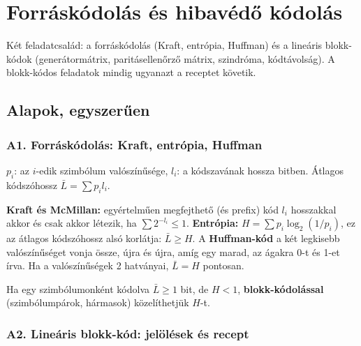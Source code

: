 \setcounter{chapter}{3}
\chapter{\texorpdfstring{Forráskódolás és hibavédő kódolás}{Forráskódolás és hibavédő kódolás}}\label{f4}
Két feladatcsalád: a forráskódolás (Kraft, entrópia, Huffman) és a lineáris blokk-kódok (generátormátrix, paritásellenőrző mátrix, szindróma, kódtávolság). A blokk-kódos feladatok mindig ugyanazt a receptet követik.

\section{Alapok, egyszerűen}
\subsection{\texorpdfstring{A1. Forráskódolás: Kraft, entrópia, Huffman}{A1. Forráskódolás: Kraft, entrópia, Huffman}}\label{a4-forras}
$p_i$: az $i$-edik szimbólum valószínűsége, $l_i$: a kódszavának hossza bitben. Átlagos kódszóhossz $\bar L=\sum p_il_i$.

\textbf{Kraft és McMillan:} egyértelműen megfejthető (és prefix) kód $l_i$ hosszakkal akkor és csak akkor létezik, ha $\sum2^{-l_i}\le1$. \textbf{Entrópia:} $H=\sum p_i\log_2(1/p_i)$, ez az átlagos kódszóhossz alsó korlátja: $\bar L\ge H$. A \textbf{Huffman-kód} a két legkisebb valószínűséget vonja össze, újra és újra, amíg egy marad, az ágakra 0-t és 1-et írva. Ha a valószínűségek 2 hatványai, $\bar L=H$ pontosan.

Ha egy szimbólumonként kódolva $\bar L\ge1$ bit, de $H<1$, \textbf{blokk-kódolással} (szimbólumpárok, hármasok) közelíthetjük $H$-t.

\subsection{\texorpdfstring{A2. Lineáris blokk-kód: jelölések és recept}{A2. Lineáris blokk-kód: jelölések és recept}}\label{a4-blokk}
\par{}\par

